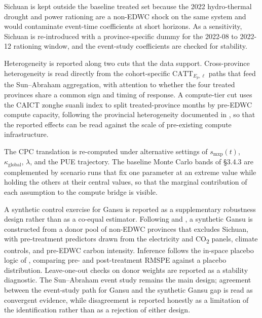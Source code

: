 \documentclass[12pt,a4paper]{article}
\begin{document}
Sichuan is kept outside the baseline treated set because the 2022
hydro-thermal drought and power rationing are a non-EDWC shock on the
same system and would contaminate event-time coefficients at short
horizons. As a sensitivity, Sichuan is re-introduced with a
province-specific dummy for the 2022-08 to 2022-12 rationing window,
and the event-study coefficients are checked for stability.

Heterogeneity is reported along two cuts that the data support.
Cross-province heterogeneity is read directly from the cohort-specific
$\text{CATT}_{E_p, \ell}$ paths that feed the Sun--Abraham
aggregation, with attention to whether the four treated provinces
share a common sign and timing of response. A compute-tier cut uses
the CAICT zonghe suanli index to split treated-province months by
pre-EDWC compute capacity, following the provincial heterogeneity
documented in \citet{nietal-2024-co2emissionmitigationpathways}, so that
the reported effects can be read against the scale of pre-existing
compute infrastructure.

The CPC translation is re-computed under alternative settings of
$s_{\text{mxp}}(t)$, $\kappa_{\text{global}}$, $\lambda$, and the
PUE trajectory. The baseline Monte Carlo bands of §3.4.3 are
complemented by scenario runs that fix one parameter at an extreme
value while holding the others at their central values, so that the
marginal contribution of each assumption to the compute bridge is
visible.

A synthetic control exercise for Gansu is reported as a supplementary
robustness design rather than as a co-equal estimator. Following
\citet{abadieetal-2010-syntheticcontrolmethodsa} and
\citet{abadieetal-2015-comparativepoliticssynthetic}, a synthetic
Gansu is constructed from a donor pool of non-EDWC provinces that
excludes Sichuan, with pre-treatment predictors drawn from the
electricity and CO\textsubscript{2} panels, climate controls, and
pre-EDWC carbon intensity. Inference follows the in-space placebo
logic of \citet{abadieetal-2010-syntheticcontrolmethodsa}, comparing
pre- and post-treatment RMSPE against a placebo distribution.
Leave-one-out checks on donor weights are reported as a stability
diagnostic. The Sun--Abraham event study remains the main design;
agreement between the event-study path for Gansu and the synthetic
Gansu gap is read as convergent evidence, while disagreement is
reported honestly as a limitation of the identification rather than
as a rejection of either design.


\end{document}
